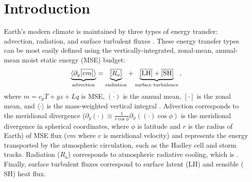 \documentclass{ametsocV5}
\begin{document}




\section{Introduction}
Earth's modern climate is maintained by three types of energy transfer: advection, radiation, and surface turbulent fluxes \citep[e.g., see Ch.~6.2 in][]{hartmann2016}. These energy transfer types can be most easily defined using the vertically-integrated, zonal-mean, annual-mean moist static energy (MSE) budget:
\begin{equation} \label{eq:mse-ann}
    {\underbrace{ \langle\partial_y \overline{[vm]}\rangle}_{\text{advection}}} = {\underbrace{\vphantom{\partial_y \langle [vm]\rangle} \overline{[R_{a}]}}_\text{radiation}} + {\underbrace{\vphantom{\partial_y \langle [vm]\rangle} \mathrm{\overline{[LH]}+\overline{[SH]}}}_\text{surface turbulence}} \, ,
\end{equation}
where $m=c_p T + gz + Lq$ is MSE, $\overline{(\cdot)}$ is the annual mean, $[\cdot]$ is the zonal mean, and $\langle \cdot \rangle$ is the mass-weighted vertical integral \citep{neelin1987}. Advection corresponds to the meridional divergence ($\partial_y(\cdot)\equiv \frac{1}{r\cos{\phi}}\partial_\phi\left((\cdot)\cos{\phi}\right)$ is the meridional divergence in spherical coordinates, where $\phi$ is latitude and $r$ is the radius of Earth) of MSE flux ($vm$ where $v$ is meridional velocity) and represents the energy transported by the atmospheric circulation, such as the Hadley cell and storm tracks. Radiation ($R_a$) corresponds to atmospheric radiative cooling, which is . Finally, surface turbulent fluxes correspond to surface latent ($\mathrm{LH}$) and sensible ($\mathrm{SH}$) heat flux.
\end{document}
